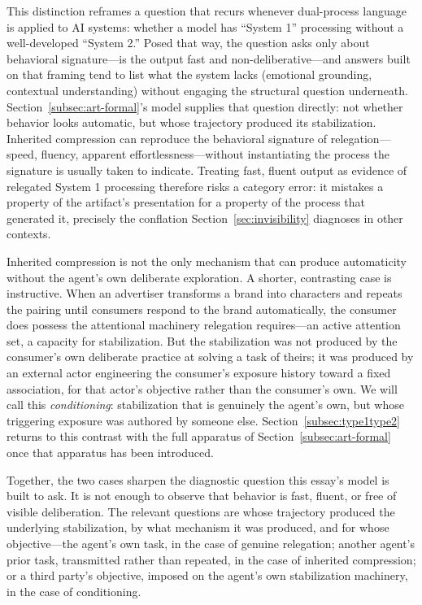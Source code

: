 \documentclass[12pt, a4paper]{article}
\theoremstyle{plain}
\theoremstyle{definition}
\theoremstyle{remark}
\begin{document}
This distinction reframes a question that recurs whenever dual-process language is applied to AI systems: whether a model has ``System 1'' processing without a well-developed ``System 2.'' Posed that way, the question asks only about behavioral signature---is the output fast and non-deliberative---and answers built on that framing tend to list what the system lacks (emotional grounding, contextual understanding) without engaging the structural question underneath. Section~\ref{subsec:art-formal}'s model supplies that question directly: not whether behavior looks automatic, but whose trajectory produced its stabilization. Inherited compression can reproduce the behavioral signature of relegation---speed, fluency, apparent effortlessness---without instantiating the process the signature is usually taken to indicate. Treating fast, fluent output as evidence of relegated System 1 processing therefore risks a category error: it mistakes a property of the artifact's presentation for a property of the process that generated it, precisely the conflation Section~\ref{sec:invisibility} diagnoses in other contexts.

Inherited compression is not the only mechanism that can produce automaticity without the agent's own deliberate exploration. A shorter, contrasting case is instructive. When an advertiser transforms a brand into characters and repeats the pairing until consumers respond to the brand automatically, the consumer does possess the attentional machinery relegation requires---an active attention set, a capacity for stabilization. But the stabilization was not produced by the consumer's own deliberate practice at solving a task of theirs; it was produced by an external actor engineering the consumer's exposure history toward a fixed association, for that actor's objective rather than the consumer's own. We will call this \emph{conditioning}: stabilization that is genuinely the agent's own, but whose triggering exposure was authored by someone else. Section~\ref{subsec:type1type2} returns to this contrast with the full apparatus of Section~\ref{subsec:art-formal} once that apparatus has been introduced.

Together, the two cases sharpen the diagnostic question this essay's model is built to ask. It is not enough to observe that behavior is fast, fluent, or free of visible deliberation. The relevant questions are whose trajectory produced the underlying stabilization, by what mechanism it was produced, and for whose objective---the agent's own task, in the case of genuine relegation; another agent's prior task, transmitted rather than repeated, in the case of inherited compression; or a third party's objective, imposed on the agent's own stabilization machinery, in the case of conditioning.
\end{document}

